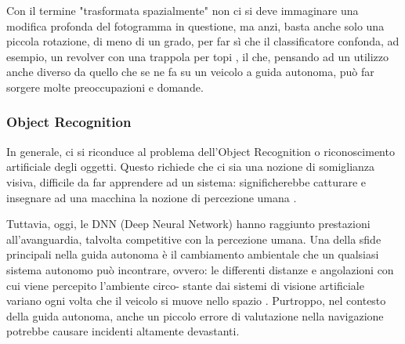\documentclass[14pt]{extarticle}
\begin{document}
Con il termine "trasformata spazialmente" non ci si deve immaginare
una modifica profonda del fotogramma in questione, ma anzi, basta
anche solo una piccola rotazione, di meno di un grado, per far sì che il
classificatore confonda, ad esempio, un revolver con una trappola per topi
\cite{engstrom2019exploring}, il che, pensando ad un utilizzo anche diverso da quello che se ne fa
su un veicolo a guida autonoma, può far sorgere molte preoccupazioni e
domande.%

\subsubsection{Object Recognition}
In generale, ci si riconduce al problema dell'Object Recognition o riconoscimento artificiale degli oggetti. Questo richiede che ci sia una nozione
di somiglianza visiva, difficile da far apprendere ad un sistema: significherebbe catturare e insegnare ad una macchina la nozione di percezione
umana \cite{engstrom2019exploring}.

Tuttavia, oggi, le DNN (Deep Neural Network) hanno raggiunto prestazioni all'avanguardia, talvolta competitive con la percezione umana.
Una della sfide principali nella guida autonoma è il cambiamento ambientale che un qualsiasi sistema autonomo può incontrare, ovvero: le
differenti distanze e angolazioni con cui viene percepito l'ambiente circo-
stante dai sistemi di visione artificiale variano ogni volta che il veicolo si
muove nello spazio \cite{eykholt2018robust} .
Purtroppo, nel contesto della guida autonoma, anche un piccolo errore
di valutazione nella navigazione potrebbe causare incidenti altamente
devastanti.

\end{document}
